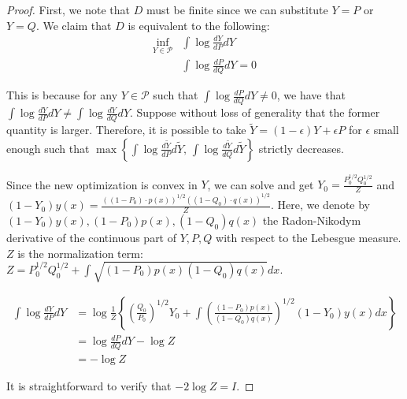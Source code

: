 \begin{proof} 

First, we note that $D$ must be finite since we can substitute $Y = P$ or $Y= Q$. We claim that $D$ is equivalent to the following:
\begin{align*}
\inf_{Y \in \mathcal{P}} & \int \log \frac{dY}{dP} dY \\
  & \int \log \frac{dP}{dQ} dY = 0
\end{align*}

This is because for any $Y \in \mathcal{P}$ such that $\int \log \frac{dP}{dQ} dY \neq 0$, 
we have that $\int \log \frac{dY}{dP} dY \neq \int \log \frac{dY}{dQ} dY$. 
Suppose without loss of generality that the former quantity is larger. 
Therefore, it is possible to take $\tilde{Y} = (1 - \epsilon) Y + \epsilon P$ for $\epsilon$ small enough such that 
$ \max \left\{ \int \log \frac{d\tilde{Y}}{dP} d\tilde{Y}, \, \int \log \frac{d\tilde{Y}}{dQ} d\tilde{Y} \right\}$ strictly decreases. 

Since the new optimization is convex in $Y$, we can solve and get $Y_0 = \frac{P_0^{1/2} Q_0^{1/2}}{Z}$ and $(1-Y_0) y(x) = \frac{((1-P_0) \cdot p(x))^{1/2} ((1-Q_0) \cdot q(x))^{1/2}}{Z}$. Here, we denote by $(1-Y_0) y(x), (1-P_0)p(x), (1-Q_0)q(x)$ the Radon-Nikodym derivative of the continuous part of $Y, P, Q$ with respect to the Lebesgue measure. $Z$ is the normalization term: $Z = P_0^{1/2} Q_0^{1/2} + \int \sqrt{ (1-P_0) p(x) (1-Q_0) q(x)} dx$. 

\begin{align*}
\int \log \frac{dY}{dP} dY  &= \log \frac{1}{Z} \left\{ 
           \left( \frac{Q_0}{P_0} \right)^{1/2}  Y_0 + \int \left(\frac{(1-P_0) p(x)}{(1-Q_0)q(x)} \right)^{1/2} (1-Y_0) y(x) dx \right\} \\
  &= \log \frac{dP}{dQ} dY - \log Z \\
  &= - \log Z 
\end{align*}

It is straightforward to verify that $-2 \log Z = I$. 

\end{proof}





